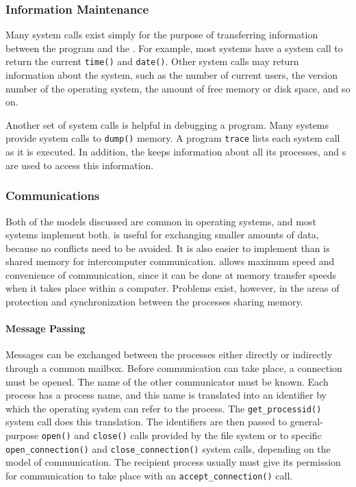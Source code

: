 \subsubsection{Information Maintenance}\label{subsubsec:Information_Maintenance}
Many system calls exist simply for the purpose of transferring information between the  program and the .
For example, most systems have a system call to return the current \texttt{time()} and \texttt{date()}.
Other system calls may return information about the system, such as the number of current users, the version number of the operating system, the amount of free memory or disk space, and so on.

Another set of system calls is helpful in debugging a program.
Many systems provide system calls to \texttt{dump()} memory.
A program \texttt{trace} lists each system call as it is executed.
In addition, the  keeps information about all its processes, and s are used to access this information.

\subsubsection{Communications}\label{subsubsec:Communications}
Both of the models discussed are common in operating systems, and most systems implement both.
 is useful for exchanging smaller amounts of data, because no conflicts need to be avoided.
It is also easier to implement than is shared memory for intercomputer communication.
 allows maximum speed and convenience of communication, since it can be done at memory transfer speeds when it takes place within a computer.
Problems exist, however, in the areas of protection and synchronization between the processes sharing memory.

\paragraph{Message Passing}\label{par:Message_Passing}
Messages can be exchanged between the processes either directly or indirectly through a common mailbox.
Before communication can take place, a connection must be opened.
The name of the other communicator must be known.
Each process has a process name, and this name is translated into an identifier by which the operating system can refer to the process.
The \texttt{get_processid()} system call does this translation.
The identifiers are then passed to general-purpose \texttt{open()} and \texttt{close()} calls provided by the file system or to specific \texttt{open_connection()} and \texttt{close_connection()} system calls, depending on the model of communication.
The recipient process usually must give its permission for communication to take place with an \texttt{accept_connection()} call.

